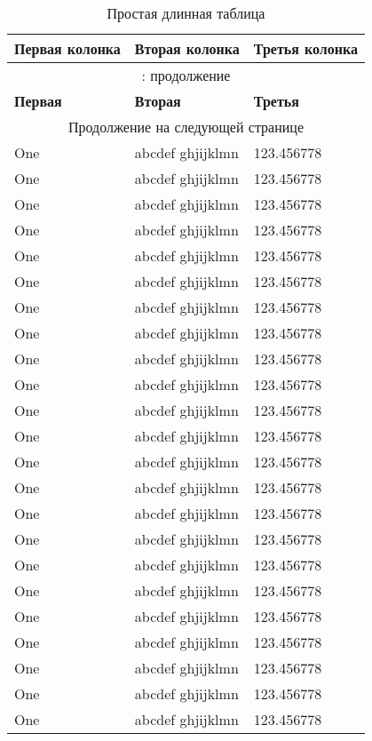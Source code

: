 \documentclass[12pt, a4paper]{article}
\begin{document}
\begin{center}
\begin{longtable}{|l|l|l|}
\caption{Простая длинная таблица} \label{tab:long} \\
\hline
\textbf{Первая колонка} & \textbf{Вторая колонка} & \textbf{Третья колонка} \\ \hline 
\endfirsthead

\multicolumn{3}{c}{\tablename{} \thetable{}: продолжение } \\
\hline 
\textbf{Первая}&\textbf{Вторая} & \textbf{Третья} \\
\hline 
\endhead

\hline
\multicolumn{3}{|c|}{Продолжение на следующей странице} \\ \hline
\endfoot
\hline
\endlastfoot


One & abcdef ghjijklmn & 123.456778 \\
One & abcdef ghjijklmn & 123.456778 \\
One & abcdef ghjijklmn & 123.456778 \\
One & abcdef ghjijklmn & 123.456778 \\
One & abcdef ghjijklmn & 123.456778 \\
One & abcdef ghjijklmn & 123.456778 \\
One & abcdef ghjijklmn & 123.456778 \\
One & abcdef ghjijklmn & 123.456778 \\
One & abcdef ghjijklmn & 123.456778 \\
One & abcdef ghjijklmn & 123.456778 \\
One & abcdef ghjijklmn & 123.456778 \\
One & abcdef ghjijklmn & 123.456778 \\
One & abcdef ghjijklmn & 123.456778 \\
One & abcdef ghjijklmn & 123.456778 \\
One & abcdef ghjijklmn & 123.456778 \\
One & abcdef ghjijklmn & 123.456778 \\
One & abcdef ghjijklmn & 123.456778 \\
One & abcdef ghjijklmn & 123.456778 \\
One & abcdef ghjijklmn & 123.456778 \\
One & abcdef ghjijklmn & 123.456778 \\
One & abcdef ghjijklmn & 123.456778 \\
One & abcdef ghjijklmn & 123.456778 \\
One & abcdef ghjijklmn & 123.456778 \\

\end{longtable}
\end{center}
\end{document}
